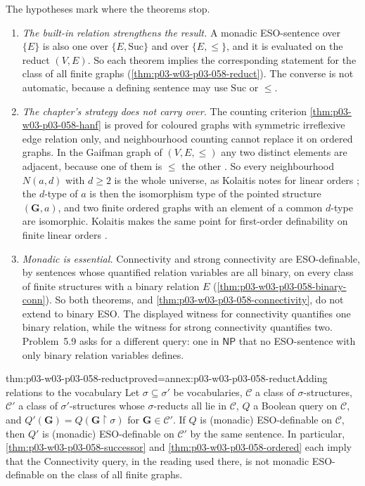 The hypotheses mark where the theorems stop.
\begin{enumerate}
\item \emph{The built-in relation strengthens the result.} A monadic
      ESO-sentence over \(\{E\}\) is also one over \(\{E,\mathrm{Suc}\}\)
      and over \(\{E,\le\}\), and it is evaluated on the reduct
      \((V,E)\). So each theorem implies the corresponding statement for
      the class of all finite graphs
      (\cref{thm:p03-w03-p03-058-reduct}). The converse is not automatic,
      because a defining sentence may use \(\mathrm{Suc}\) or \(\le\).
\item \emph{The chapter's strategy does not carry over.} The counting
      criterion \cref{thm:p03-w03-p03-058-hanf} is proved for coloured
      graphs with symmetric irreflexive edge relation only, and neighbourhood
      counting cannot replace it on ordered graphs. In the Gaifman graph of
      \((V,E,\le)\) any two distinct elements are adjacent, because one of
      them is \(\le\) the other \cite[Def.~3.22, p.~18]{Kolaitis2003ExpressivePowerNotes}.
      So every neighbourhood \(N(a,d)\) with \(d\ge2\) is the whole
      universe, as Kolaitis notes for linear orders
      \cite[Example~3.23, p.~18]{Kolaitis2003ExpressivePowerNotes}; the
      \(d\)-type of \(a\) is then the isomorphism type of the pointed
      structure \((\mathbf G,a)\), and two finite ordered graphs with an
      element of a common \(d\)-type are isomorphic. Kolaitis makes the same
      point for first-order definability on finite linear orders
      \cite[p.~20]{Kolaitis2003ExpressivePowerNotes}.
\item \emph{Monadic is essential.} Connectivity and strong connectivity are
      ESO-definable, by sentences whose quantified relation variables are
      all binary, on every class of finite structures with a binary
      relation \(E\) (\cref{thm:p03-w03-p03-058-binary-conn}). So both
      theorems, and \cref{thm:p03-w03-p03-058-connectivity}, do not extend
      to binary ESO. The displayed witness for connectivity quantifies one
      binary relation, while the witness for strong connectivity quantifies
      two. Problem~5.9 asks
      for a different query: one in \(\mathsf{NP}\) that no ESO-sentence
      with only binary relation variables defines.
\end{enumerate}

\begin{hblemma}{thm:p03-w03-p03-058-reduct}{proved=annex:p03-w03-p03-058-reduct}{Adding relations to the vocabulary}
Let \(\sigma\subseteq\sigma'\) be vocabularies, \(\mathcal C\) a class of
\(\sigma\)-structures, \(\mathcal C'\) a class of \(\sigma'\)-structures
whose \(\sigma\)-reducts all lie in \(\mathcal C\), \(Q\) a Boolean query on
\(\mathcal C\), and \(Q'(\mathbf G)=Q(\mathbf G{\restriction}\sigma)\) for
\(\mathbf G\in\mathcal C'\). If \(Q\) is (monadic) ESO-definable on
\(\mathcal C\), then \(Q'\) is (monadic) ESO-definable on \(\mathcal C'\) by
the same sentence. In particular,
\cref{thm:p03-w03-p03-058-successor} and
\cref{thm:p03-w03-p03-058-ordered} each imply that the Connectivity query,
in the reading used there, is not monadic ESO-definable on the class of all
finite graphs.
\end{hblemma}

